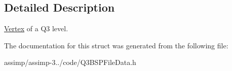 \subsection{Detailed Description}
\hyperlink{class_assimp_1_1_vertex}{Vertex} of a Q3 level. 

The documentation for this struct was generated from the following file\+:\begin{DoxyCompactItemize}
\item 
assimp/assimp-\/3../code/Q3\+B\+S\+P\+File\+Data.\+h\end{DoxyCompactItemize}
